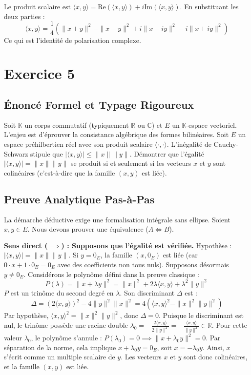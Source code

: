 \documentclass[11pt,a4paper]{report}
\begin{document}
Le produit scalaire est $\langle x, y \rangle = \text{Re}(\langle x, y \rangle) + i\text{Im}(\langle x, y \rangle)$. En substituant les deux parties :
$$\langle x, y \rangle = \frac{1}{4} \left( \|x + y\|^2 - \|x - y\|^2 + i\|x - iy\|^2 - i\|x + iy\|^2 \right)$$
Ce qui est l'identité de polarisation complexe.


\section{Exercice 5}


\subsection*{Énoncé Formel et Typage Rigoureux}
Soit $\mathbb{K}$ un corps commutatif (typiquement $\mathbb{R}$ ou $\mathbb{C}$) et $E$ un $\mathbb{K}$-espace vectoriel. L'enjeu est d'éprouver la consistance algébrique des formes bilinéaires.
Soit $E$ un espace préhilbertien réel avec son produit scalaire $\langle \cdot, \cdot \rangle$.
L'inégalité de Cauchy-Schwarz stipule que $|\langle x, y \rangle| \le \|x\| \|y\|$.
Démontrer que l'égalité $|\langle x, y \rangle| = \|x\| \|y\|$ se produit si et seulement si les vecteurs $x$ et $y$ sont colinéaires (c'est-à-dire que la famille $(x, y)$ est liée).

\subsection*{Preuve Analytique Pas-à-Pas}
La démarche déductive exige une formalisation intégrale sans ellipse.
Soient $x, y \in E$. Nous devons prouver une équivalence ($A \iff B$).

\textbf{Sens direct ($\implies$) : Supposons que l'égalité est vérifiée.}
Hypothèse : $|\langle x, y \rangle| = \|x\| \|y\|$.
Si $y = 0_E$, la famille $(x, 0_E)$ est liée (car $0 \cdot x + 1 \cdot 0_E = 0_E$ avec des coefficients non tous nuls).
Supposons désormais $y \neq 0_E$. Considérons le polynôme défini dans la preuve classique :
$$P(\lambda) = \|x + \lambda y\|^2 = \|x\|^2 + 2\lambda\langle x, y \rangle + \lambda^2\|y\|^2$$
$P$ est un trinôme du second degré en $\lambda$. Son discriminant $\Delta$ est :
$$\Delta = (2\langle x, y \rangle)^2 - 4\|y\|^2\|x\|^2 = 4(\langle x, y \rangle^2 - \|x\|^2\|y\|^2)$$
Par hypothèse, $\langle x, y \rangle^2 = \|x\|^2\|y\|^2$, donc $\Delta = 0$.
Puisque le discriminant est nul, le trinôme possède une racine double $\lambda_0 = -\frac{2\langle x, y \rangle}{2\|y\|^2} = -\frac{\langle x, y \rangle}{\|y\|^2} \in \mathbb{R}$.
Pour cette valeur $\lambda_0$, le polynôme s'annule :
$P(\lambda_0) = 0 \implies \|x + \lambda_0 y\|^2 = 0$.
Par séparation de la norme, cela implique $x + \lambda_0 y = 0_E$, soit $x = -\lambda_0 y$.
Ainsi, $x$ s'écrit comme un multiple scalaire de $y$. Les vecteurs $x$ et $y$ sont donc colinéaires, et la famille $(x, y)$ est liée.
\end{document}
